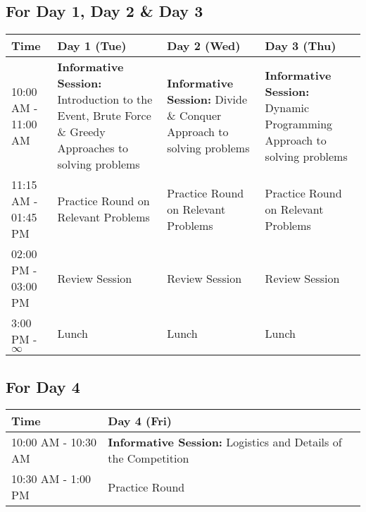\documentclass[12pt]{article}
\begin{document}
\subsection*{\centering For Day 1, Day 2 \& Day 3}
\begin{table}[H]
    \centering
    \begin{tabular}{|p{2.1cm}|p{4.3cm}|p{4.3cm}|p{4.3cm}|}
        \hline
        Time                & Day 1 (Tue)                                                                                                   & Day 2 (Wed)                                                                  & Day 3 (Thu)                                                                    \\
        \hline
        10:00 AM - 11:00 AM & \textbf{Informative Session:} Introduction to the Event, Brute Force \& Greedy Approaches to solving problems & \textbf{Informative Session:} Divide \& Conquer Approach to solving problems & \textbf{Informative Session:} Dynamic Programming Approach to solving problems \\
        \hline
        11:15 AM - 01:45 PM & Practice Round on Relevant Problems                                                                           & Practice Round on Relevant Problems                                          & Practice Round on Relevant Problems                                            \\
        \hline
        02:00 PM - 03:00 PM & Review Session                                                                                                & Review Session                                                               & Review Session                                                                 \\
        \hline
        3:00 PM - $\infty$  & Lunch                                                                                                         & Lunch                                                                        & Lunch                                                                          \\
        \hline
    \end{tabular}
\end{table}

\subsection*{\centering For Day 4}
\begin{table}[H]
    \centering
    \begin{tabular}{|p{2.1cm}|p{12.9cm}|}
        \hline
        Time                & Day 4 (Fri)                                                            \\
        \hline
        10:00 AM - 10:30 AM & \textbf{Informative Session:} Logistics and Details of the Competition \\
        \hline
        10:30 AM - 1:00 PM  & Practice Round                                                         \\
        \hline
    \end{tabular}
\end{table}
\end{document}
